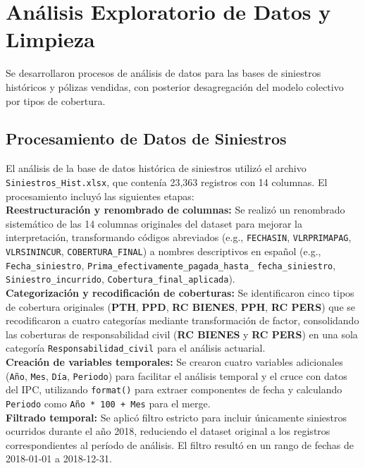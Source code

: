 \section{Análisis Exploratorio de Datos y Limpieza}

Se desarrollaron procesos de análisis de datos para las bases de siniestros históricos y pólizas vendidas, con posterior desagregación del modelo colectivo por tipos de cobertura.

\subsection{Procesamiento de Datos de Siniestros}

El análisis de la base de datos histórica de siniestros utilizó el archivo \texttt{Siniestros\_Hist.xlsx}, que contenía 23,363 registros con 14 columnas. El procesamiento incluyó las siguientes etapas:\\

\textbf{Reestructuración y renombrado de columnas:} Se realizó un renombrado sistemático de las 14 columnas originales del dataset para mejorar la interpretación, transformando códigos abreviados (e.g., \texttt{FECHASIN}, \texttt{VLRPRIMAPAG}, \texttt{VLRSININCUR}, \texttt{COBERTURA\_FINAL}) a nombres descriptivos en español (e.g., \texttt{Fecha\_siniestro}, \texttt{Prima\_efectivamente\_pagada\_hasta\_} \texttt{fecha\_siniestro}, \texttt{Siniestro\_incurrido}, \texttt{Cobertura\_final\_aplicada}).\\

\textbf{Categorización y recodificación de coberturas:} Se identificaron cinco tipos de cobertura originales (\textbf{PTH}, \textbf{PPD}, \textbf{RC BIENES}, \textbf{PPH}, \textbf{RC PERS}) que se recodificaron a cuatro categorías mediante transformación de factor, consolidando las coberturas de responsabilidad civil (\textbf{RC BIENES} y \textbf{RC PERS}) en una sola categoría \texttt{Responsabilidad\_civil} para el análisis actuarial.\\

\textbf{Creación de variables temporales:} Se crearon cuatro variables adicionales (\texttt{Año}, \texttt{Mes}, \texttt{Día}, \texttt{Periodo}) para facilitar el análisis temporal y el cruce con datos del IPC, utilizando \texttt{format()} para extraer componentes de fecha y calculando \texttt{Periodo} como \texttt{Año * 100 + Mes} para el merge.\\

\textbf{Filtrado temporal:} Se aplicó filtro estricto para incluir únicamente siniestros ocurridos durante el año 2018, reduciendo el dataset original a los registros correspondientes al período de análisis. El filtro resultó en un rango de fechas de 2018-01-01 a 2018-12-31.\\

